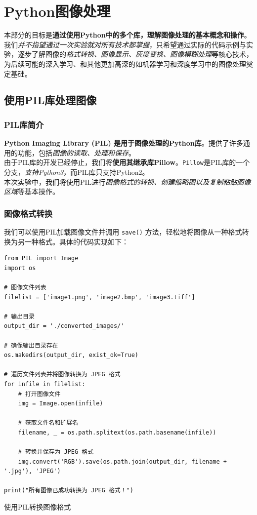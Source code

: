 \chapter{Python图像处理}
\label{cp:pythonimage}

本部分的目标是\textbf{通过使用Python中的多个库，理解图像处理的基本概念和操作}。我们\textit{并不指望通过一次实验就对所有技术都掌握}，只希望通过实际的代码示例与实验，逐步了解图像的\textit{格式转换、图像显示、灰度变换、图像模糊处理}等核心技术，为后续可能的深入学习、和其他更加高深的如机器学习和深度学习中的图像处理奠定基础。

\section{使用PIL库处理图像}

\subsection{PIL库简介}

\textbf{Python Imaging Library (PIL) 是用于图像处理的Python库}。提供了许多通用的功能，包括\textit{图像的读取、处理和保存}。\\

由于PIL库的开发已经停止，我们将\textbf{使用其继承库Pillow}。\texttt{Pillow}是PIL库的一个分支，\textit{支持Python3}，而PIL库只支持Python2。\\

本次实验中，我们将使用PIL进行\textit{图像格式的转换、创建缩略图以及复制粘贴图像区域}等基本操作。

\subsection{图像格式转换}
\label{subsec:formatconvert}

我们可以使用PIL加载图像文件并调用 \texttt{save()} 方法，轻松地将图像从一种格式转换为另一种格式。具体的代码实现如下：

\begin{longlisting}
    \begin{verbatim}
from PIL import Image
import os

# 图像文件列表
filelist = ['image1.png', 'image2.bmp', 'image3.tiff']

# 输出目录
output_dir = './converted_images/'

# 确保输出目录存在
os.makedirs(output_dir, exist_ok=True)

# 遍历文件列表并将图像转换为 JPEG 格式
for infile in filelist:
    # 打开图像文件
    img = Image.open(infile)
    
    # 获取文件名和扩展名
    filename, _ = os.path.splitext(os.path.basename(infile))
    
    # 转换并保存为 JPEG 格式
    img.convert('RGB').save(os.path.join(output_dir, filename + '.jpg'), 'JPEG')

print("所有图像已成功转换为 JPEG 格式！")
    \end{verbatim}
    \caption{使用PIL转换图像格式}
    \label{listing:pilconvert}
\end{longlisting}

